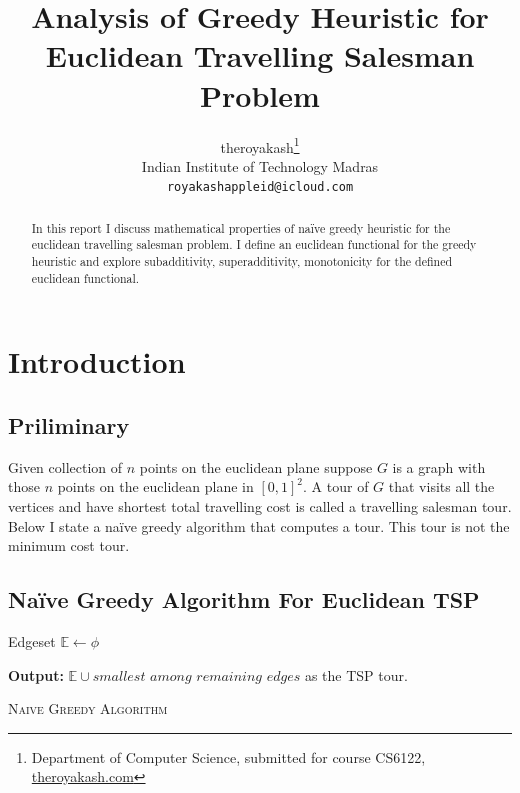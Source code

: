 \documentclass{article}
\title{Analysis of Greedy Heuristic for Euclidean Travelling Salesman Problem}
\author{
    theroyakash\thanks{\textsf{Department of Computer Science, submitted for course} \textsf{CS6122}, \href{https://theroyakash.com}{\textsf{theroyakash.com}}}\\
    Indian Institute of Technology Madras \\
    \texttt{royakashappleid@icloud.com} \\
}
\theoremstyle{define}
\theoremstyle{remark}
\begin{document}
\maketitle

\begin{abstract}
    In this report I discuss mathematical properties of
    naïve greedy heuristic for the euclidean travelling salesman problem.
    I define an euclidean functional for the greedy heuristic and explore
    subadditivity, superadditivity, monotonicity for the defined
    euclidean functional.
\end{abstract}

\section{Introduction}
\subsection{Priliminary}
Given collection of $n$ points on the euclidean plane suppose $G$ is a graph
with those $n$ points on the euclidean plane in $[0,1]^2$. A tour of $G$ that
visits all the vertices and have shortest total travelling cost is called a
travelling salesman tour. Below I state a naïve greedy algorithm that computes
a tour. This tour is not the minimum cost tour.

\subsection{Naïve Greedy Algorithm For Euclidean TSP}

\begin{algorithm}[H]\label{alg:1}

    \BlankLine
    Edgeset $\mathbb{E} \gets \phi$\\

    \textbf{Output:} $\mathbb{E} \cup \textit{smallest among remaining edges}$ as the TSP tour.

    \caption{\textsc{Naive Greedy Algorithm}}
\end{algorithm}
\end{document}
